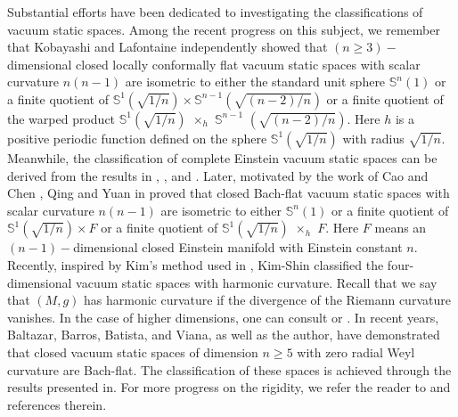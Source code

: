 \documentclass[10pt,leqno,oneside]{amsart}
\begin{document}
          Substantial efforts have been dedicated to investigating the classifications of vacuum static spaces. Among the recent progress on this subject, we remember that Kobayashi \cite{Kobayashi1982} and Lafontaine \cite{Lafontaine1983} independently showed that $(n\ge3)-$dimensional closed locally conformally flat vacuum static spaces with scalar curvature $n(n-1)$ are isometric to either the standard unit sphere $\mathbb S^n(1)$ or a finite quotient of $\mathbb S^1(\sqrt{1/n})\times\mathbb S^{n-1}(\sqrt{(n-2)/n})$ or a finite quotient of the warped product $\mathbb S^1(\sqrt{1/n})$ $\times_h$ $\mathbb S^{n-1}$ $(\sqrt{(n-2)/n}).$ Here $h$ is a positive periodic function defined on the sphere $\mathbb S^1(\sqrt{1/n})$ with radius $\sqrt{1/n}.$ Meanwhile, the classification of complete Einstein vacuum static spaces can be derived from the results in \cite[Theorem A]{Obata1962}, \cite[Theorem B]{Kanai1983}, and \cite[Corollary E]{Kanai1983}. Later, motivated by the work of Cao and Chen \cite{CaoChen2012,CaoChen2013}, Qing and Yuan in \cite{QingYuan2013} proved that closed Bach-flat vacuum static spaces with scalar curvature $n(n-1)$ are isometric to either $\mathbb S^n(1)$ or a finite quotient of $\mathbb S^1(\sqrt{1/n})\times F$ or a finite quotient of $\mathbb S^1(\sqrt{1/n})$ $\times_h$ $F.$ Here $F$ means an $(n-1)-$dimensional closed Einstein manifold with Einstein constant $n.$ Recently, inspired by Kim's method used in \cite{Kim2017}, Kim-Shin \cite{KimShin2018} classified the four-dimensional vacuum static spaces with harmonic curvature. Recall that we say that $(M, g)$ has harmonic curvature if the divergence of the Riemann curvature vanishes. In the case of higher dimensions, one can consult \cite{Li2021} or \cite{Kim}. In recent years, Baltazar, Barros, Batista, and Viana\cite{BBBV2020}, as well as the author\cite{Jian2023}, have demonstrated that closed vacuum static spaces of dimension \(n\geq 5\) with zero radial Weyl curvature are Bach-flat. The classification of these spaces is achieved through the results presented in\cite{QingYuan2013}. For more progress on the rigidity, we refer the reader to \cite{Shen1997} \cite{BessieresLR2000} \cite{Lafontaine2009} \cite{Ambrozio2017} \cite{Baltazar2018} \cite{KimShin2018} \cite{HwangYun2021JGA} \cite{HwangYun2024} and references therein.
\end{document}
